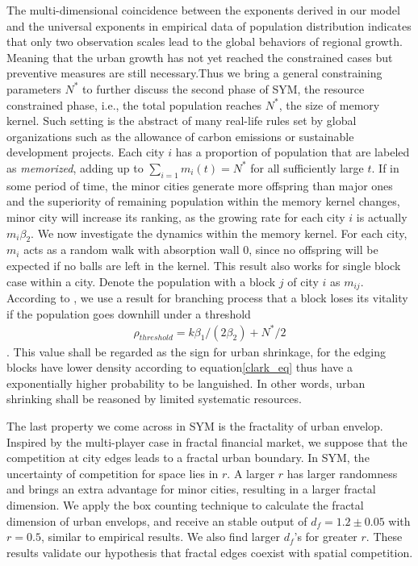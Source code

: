 \documentclass[reprint,unsortedaddress,amsmath,amssymb,floatfix,aps,prl,showkeys]{revtex4-2}
\begin{document}
The multi-dimensional coincidence between the exponents derived in our model and the universal exponents in empirical data of population distribution indicates that only two observation scales lead to the global behaviors of regional growth. Meaning that the urban growth has not yet reached the constrained cases but preventive measures are still necessary.Thus we bring a general constraining parameters $N^*$ to further discuss the second phase of SYM, the resource constrained phase, i.e., the total population reaches $N^*$, the size of memory kernel. Such setting is the abstract of many real-life rules set by global organizations such as the allowance of carbon emissions or sustainable development projects. Each city $i$ has a proportion of population that are labeled as \emph{memorized}, adding up to $\sum_{i=1} m_i(t) = N^*$ for all sufficiently large $t$. If in some period of time, the minor cities generate more offspring than major ones and the superiority of remaining population within the memory kernel changes, minor city will increase its ranking, as the growing rate for each city $i$ is actually $m_i\beta_2$. We now investigate the dynamics within the memory kernel. For each city, $m_i$ acts as a random walk with absorption wall $0$, since no offspring will be expected if no balls are left in the kernel. This result also works for single block case within a city. Denote the population with a block $j$ of city $i$ as $m_{ij}$. According to \cite{durrett1999essentials}, we use a result for branching process that a block loses its vitality if the population goes downhill under a threshold \begin{align}\rho_{threshold} = k\beta_1/(2\beta_2)+N^*/2\end{align}. This value shall be regarded as the sign for urban shrinkage, for the edging blocks have lower density according to equation\ref{clark_eq} thus have a exponentially higher probability to be languished. In other words, urban shrinking shall be reasoned by limited systematic resources.

The last property we come across in SYM is the fractality of urban envelop. Inspired by the multi-player case in fractal financial market, we suppose that the competition at city edges leads to a fractal urban boundary. In SYM, the uncertainty of competition for space lies in $r$. A larger $r$ has larger randomness and brings an extra advantage for minor cities, resulting in a larger fractal dimension. We apply the box counting technique to calculate the fractal dimension of urban envelops, and receive an stable output of $d_f = 1.2\pm 0.05$ with $r = 0.5$, similar to empirical results\cite{batty1992form}. We also find larger $d_f$'s for greater $r$. These results validate our hypothesis that fractal edges coexist with spatial competition. 
\end{document}
